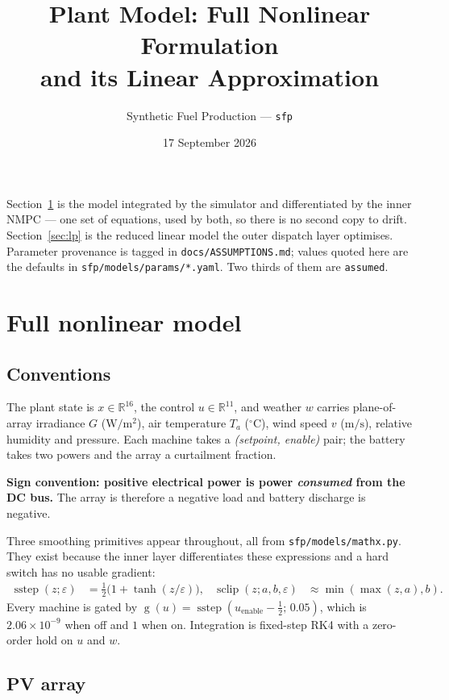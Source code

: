 \documentclass[11pt,a4paper]{article}
\title{Plant Model: Full Nonlinear Formulation\\and its Linear Approximation}
\author{Synthetic Fuel Production --- \texttt{sfp}}
\date{17 September 2026}
\newcommand{\sclip}{\operatorname{sclip}}
\newcommand{\sstep}{\operatorname{sstep}}
\newcommand{\gate}{\operatorname{g}}
\begin{document}
\maketitle

\noindent
Section~\ref{sec:full} is the model integrated by the simulator and differentiated
by the inner NMPC --- one set of equations, used by both, so there is no second
copy to drift. Section~\ref{sec:lp} is the reduced linear model the outer
dispatch layer optimises. Parameter provenance is tagged in
\texttt{docs/ASSUMPTIONS.md}; values quoted here are the defaults in
\texttt{sfp/models/params/*.yaml}. Two thirds of them are \texttt{assumed}.

\section{Full nonlinear model}
\label{sec:full}

\subsection{Conventions}

The plant state is $x\in\mathbb R^{16}$, the control $u\in\mathbb R^{11}$, and
weather $w$ carries plane-of-array irradiance $G$ ($\mathrm{W/m^2}$), air temperature
$T_a$ ($^\circ$C), wind speed $v$ ($\mathrm{m/s}$), relative humidity and
pressure. Each machine takes a \emph{(setpoint, enable)} pair; the battery takes
two powers and the array a curtailment fraction.

\textbf{Sign convention: positive electrical power is power \emph{consumed} from
the DC bus.} The array is therefore a negative load and battery discharge is
negative.

Three smoothing primitives appear throughout, all from
\texttt{sfp/models/mathx.py}. They exist because the inner layer differentiates
these expressions and a hard switch has no usable gradient:
\begin{align}
\sstep(z;\varepsilon) &= \tfrac12\bigl(1+\tanh(z/\varepsilon)\bigr), &
\sclip(z;a,b,\varepsilon) &\approx \min(\max(z,a),b).
\end{align}
Every machine is gated by $\gate(u) = \sstep(u_{\text{enable}}-\tfrac12;\,0.05)$,
which is $2.06\times10^{-9}$ when off and $1$ when on. Integration is fixed-step
RK4 with a zero-order hold on $u$ and $w$.

\subsection{PV array}
\end{document}
